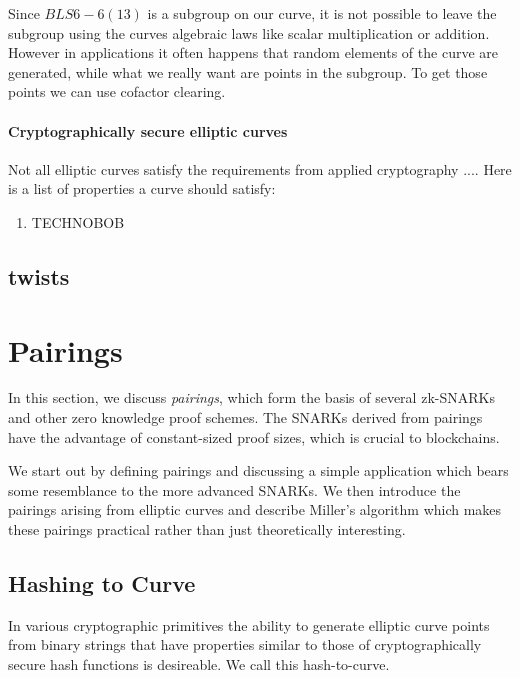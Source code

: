 \begin{definition}
Since $BLS6-6(13)$ is a subgroup on our curve, it is not possible to leave the subgroup using the curves algebraic laws like scalar multiplication or addition. However in applications it often happens that random elements of the curve are generated, while what we really want are points in the subgroup. To get those points we can use cofactor clearing.
\end{definition}

\paragraph{Cryptographically secure elliptic curves} Not all elliptic curves satisfy the requirements from applied cryptography .... Here is a list of properties a curve should satisfy:

\begin{enumerate}
\item TECHNOBOB
\end{enumerate}

\subsection{twists}

\section{Pairings}
In this section, we discuss \textit{pairings}, which form the basis of several zk-SNARKs and other zero knowledge proof schemes. The SNARKs derived from pairings have the advantage of constant-sized proof sizes, which is crucial to blockchains. 

We start out by defining pairings and discussing a simple application which bears some resemblance to the more advanced SNARKs. We then introduce the pairings arising from elliptic curves and describe Miller's algorithm which makes these pairings practical rather than just theoretically interesting.

\subsection{Hashing to Curve}
In various cryptographic primitives the ability to generate elliptic curve points from binary strings that have properties similar to those of cryptographically secure hash functions is desireable. We call this hash-to-curve.

